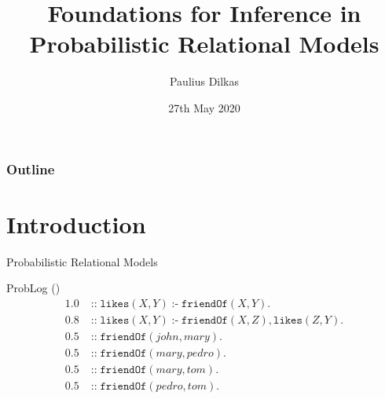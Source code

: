 \documentclass{beamer}
\author{Paulius Dilkas}
\title{Foundations for Inference in Probabilistic Relational Models}
\date{27th May 2020}
\DeclareMathOperator{\ifff}{:-}
\DeclareMathOperator{\prob}{::}
\begin{document}
\maketitle

\begin{frame}
  \frametitle{Outline}
  \tableofcontents
\end{frame}


\section{Introduction}

\begin{frame}{Probabilistic Relational Models}
  \begin{block}{ProbLog (\cite{DBLP:conf/ijcai/RaedtKT07})}
    \vspace*{-\baselineskip}\setlength\belowdisplayshortskip{0pt}
    \begin{align*}
      1.0 &\prob \mathtt{likes}(X, Y) \ifff \mathtt{friendOf}(X, Y). \\
      0.8 &\prob \mathtt{likes}(X, Y) \ifff \mathtt{friendOf}(X, Z), \mathtt{likes}(Z, Y). \\
      0.5 &\prob \mathtt{friendOf}(\mathit{john}, \mathit{mary}). \\
      0.5 &\prob \mathtt{friendOf}(\mathit{mary}, \mathit{pedro}). \\
      0.5 &\prob \mathtt{friendOf}(\mathit{mary}, \mathit{tom}). \\
      0.5 &\prob \mathtt{friendOf}(\mathit{pedro}, \mathit{tom}).
    \end{align*}
  \end{block}
\end{frame}
\end{document}
